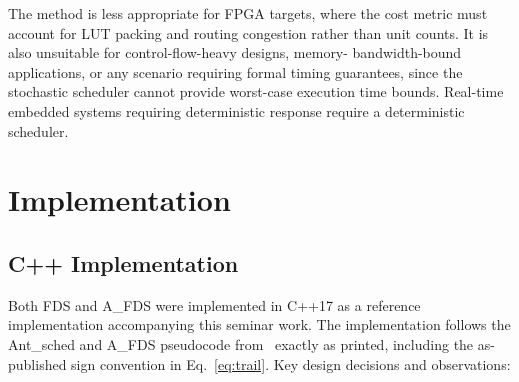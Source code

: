 \documentclass[conference]{IEEEtran}
\begin{document}
The method is less appropriate for FPGA targets, where the cost metric
must account for LUT packing and routing congestion rather than unit
counts. It is also unsuitable for control-flow-heavy designs, memory-
bandwidth-bound applications, or any scenario requiring formal timing
guarantees, since the stochastic scheduler cannot provide worst-case
execution time bounds. Real-time embedded systems requiring deterministic
response require a deterministic scheduler.

\section{Implementation}

\subsection{C++ Implementation}

Both FDS and A\_FDS were implemented in C++17 as a reference
implementation accompanying this seminar work. The implementation
follows the Ant\_sched and A\_FDS pseudocode from~\cite{kopuri2004aco}
exactly as printed, including the as-published sign convention in
Eq.~\eqref{eq:trail}. Key design decisions and observations:
\end{document}
